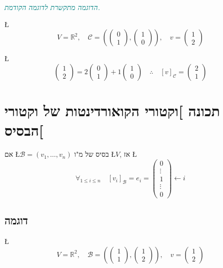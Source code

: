 \documentclass[english,hebrew]{article}
\begin{document}
{\small\textcolor{teal}{\emph{הדוגמה מתקשרת לדוגמה הקודמת.}}}{\small\par}

\L{%
\[
V=\mathbb{R}^{2},\quad\mathcal{C}=\left(\begin{pmatrix}0\\
1
\end{pmatrix},\begin{pmatrix}1\\
0
\end{pmatrix}\right),\quad v=\begin{pmatrix}1\\
2
\end{pmatrix}
\]
}%

\L{%
\[
\begin{pmatrix}1\\
2
\end{pmatrix}=2\begin{pmatrix}0\\
1
\end{pmatrix}+1\begin{pmatrix}1\\
0
\end{pmatrix}\quad\therefore\quad[v]_{\mathcal{C}}=\begin{pmatrix}2\\
1
\end{pmatrix}
\]
}%

\section{תכונה {]}וקטורי הקואורדינטות של וקטורי הבסיס{[}}

אם \L{$\mathcal{B}=(v_{1},\dots,v_{n})$} בסיס של מ"ו \L{$V$}, אז
\L{%
\[
\forall_{1\leq i\leq n}\quad[v_{i}]_{\mathcal{B}}=e_{i}=\begin{pmatrix}0\\
\vdots\\
1\\
\vdots\\
0
\end{pmatrix}\leftarrow i
\]
}%

\subsection{דוגמה}

\L{%
\[
V=\mathbb{R}^{2},\quad\mathcal{B}=\left(\begin{pmatrix}1\\
1
\end{pmatrix},\begin{pmatrix}1\\
2
\end{pmatrix}\right),\quad v=\begin{pmatrix}1\\
2
\end{pmatrix}
\]
}%
\end{document}
